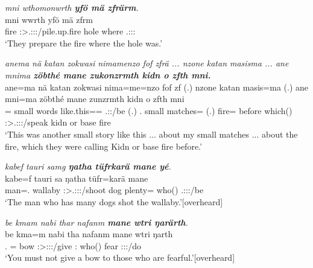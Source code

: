 \begin{exe}
	\ex \emph{mni wthomonwrth \textbf{yfö mä zfrärm}.}\\
	\gll mni wwrth yfö mä zfrm\\
	fire \Stpl:\Sbj>\Tsg.\F:\Obj:\Nonpast:\Ipfv/pile.up.fire hole where \Tsg.\F:\Sbj:\Pst:\Dur\\
	\trans `They prepare the fire where the hole was.'
	\label{ex547}
\end{exe}
\begin{exe}
	\ex \emph{anema nä katan zokwasi nimamenzo fof zfrä ... nzone katan masisma ... ane mnima \textbf{zöbthé mane zukonzrmth kidn o zfth mni.}}\\
	\gll ane=ma nä katan zokwasi nima=me=nzo fof zf (.) nzone katan masis=ma (.) ane mni=ma zöbthé mane zunzrmth kidn o zfth mni\\
	\Dem={\Char} {\Indf} small words {like.this}=\Ins={\Only} {\Emph} \Tsg.\F:\Rpst:\Ipfv/be (.) \Fsg.{\Poss} small matches={\Char} (.) {\Dem} fire={\Char} before which(\Abs) \Stpl:\Sbj>\Tsg.\F:\Obj:\Pst:\Dur/speak kidn or base fire\\
	\trans `This was another small story like this ... about my small matches ... about the fire, which they were calling Kidn or base fire before.'
	\label{ex548}
\end{exe}
\begin{exe}
	\ex \emph{kabef tauri samg \textbf{ŋatha tüfrkarä mane yé}.}\\
	\gll kabe=f tauri sa ŋatha tüfr=karä mane \\
	man=\Erg.{\Sg} wallaby \Stsg:\Sbj>\Tsg.\Masc:\Obj:\Rpst:\Pfv/shoot dog plenty={\Prop} who(\Abs) \Tsg.\Masc:\Sbj:\Nonpast:\Ipfv/be\\
	\trans `The man who has many dogs shot the wallaby.'{\hspace*{1pt}\hfill{\footnotesize{[overheard]}}}
	\label{ex549}
\end{exe}
\begin{exe}
	\ex \emph{be kmam nabi thar nafanm \textbf{mane wtri ŋarärth}.}\\
	\gll be kma=m nabi tha nafanm mane wtri ŋarth\\
	\Ssg.{\Erg} \Pot={\Appr} bow \Ssg:\Sbj>\Stpl:\Io:\Imp:\Pfv/give \Tnsg:{\Dat} who(\Abs) fear \Stpl:\Sbj:\Nonpast:\Ipfv/do\\
	\trans `You must not give a bow to those who are fearful.'{\hspace*{1pt}\hfill{\footnotesize{[overheard]}}}
	\label{ex550}
\end{exe}

